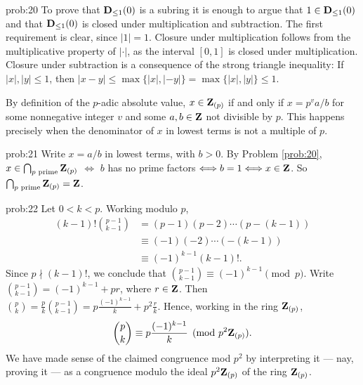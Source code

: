 \begin{sol}{prob:20} To prove that $\mathbf{D}_{\le 1}(0)$ is a subring it is enough to argue that $1 \in \mathbf{D}_{\le 1}(0)$ and that $\mathbf{D}_{\le 1}(0)$ is closed under multiplication and subtraction. The first requirement is clear, since $|1|=1$. Closure under multiplication follows from the multiplicative property of $|\cdot|$, as the interval $[0,1]$ is closed under multiplication. Closure under subtraction is a consequence of the strong triangle inequality: If $|x|, |y| \le 1$, then $|x-y| \le \max\{|x|,|-y|\} = \max\{|x|,|y|\} \le 1$. 

By definition of the $p$-adic absolute value, $x \in \mathbf{Z}_{(p)}$ if and only if $x = p^{v} a/b$ for some nonnegative integer $v$ and some $a,b\in \mathbf{Z}$ not divisible by $p$. This happens precisely when the denominator of $x$ in lowest terms is not a multiple of $p$.
\end{sol}

\begin{sol}{prob:21} Write $x=a/b$ in lowest terms, with $b>0$. By Problem \ref{prob:20}, $x \in \bigcap_{p\text{ prime}} \mathbf{Z}_{(p)}$ $\Longleftrightarrow$ $b$ has no prime factors $\Longleftrightarrow b= 1 \Longleftrightarrow x \in \mathbf{Z}$. So $\bigcap_{p\text{ prime}} \mathbf{Z}_{(p)}=\mathbf{Z}$.
\end{sol}

\begin{sol}{prob:22} Let $0 < k < p$. Working modulo $p$,
\begin{align*} (k-1)! \binom{p-1}{k-1} &= (p-1)(p-2)\cdots(p-(k-1)) \\ &\equiv (-1)(-2)\cdots(-(k-1)) \\
&\equiv (-1)^{k-1} (k-1)!.
\end{align*}
Since $p \nmid (k-1)!$, we conclude that $\binom{p-1}{k-1} \equiv (-1)^{k-1}\pmod{p}$. Write $\binom{p-1}{k-1} = (-1)^{k-1} + pr$, where $r \in \mathbf{Z}$. Then $\binom{p}{k}=\frac{p}{k}\binom{p-1}{k-1}  = p\frac{(-1)^{k-1}}{k} + p^2\frac{r}{k}$. Hence, working in the ring $\mathbf{Z}_{(p)}$, 
\[ \binom{p}{k} \equiv p \frac{(-1)^{k-1}}{k} \pmod{p^2 \mathbf{Z}_{(p)}}. \]
We have made sense of the claimed congruence mod $p^2$ by interpreting it --- nay, proving it --- as a congruence modulo the ideal $p^2 \mathbf{Z}_{(p)}$ of the ring $\mathbf{Z}_{(p)}$.
\end{sol}

